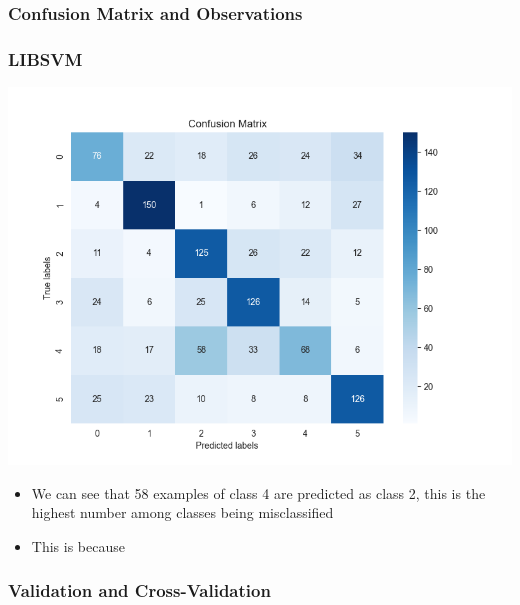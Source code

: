 \documentclass[12pt,a4paper]{article}
\begin{document}
\subsubsection{Confusion Matrix and Observations}
\subsubsection{LIBSVM}
\includegraphics[width=\textwidth]{Assignment 2/q2/confusion_matrix libsvm.png}
\begin{itemize}
    \item We can see that 58 examples of class 4 are predicted as class 2, this is the highest number among classes being misclassified
    \item This is because 
\end{itemize}

\subsubsection{Validation and Cross-Validation}
\end{document}
